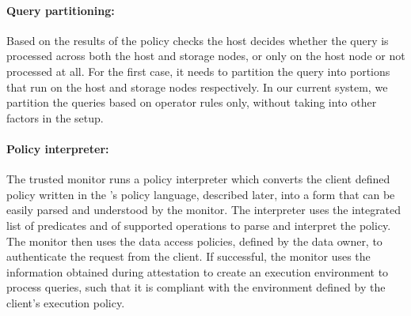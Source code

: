 \paragraph{Query partitioning:} Based on the results of the policy checks the host decides whether the query is processed across both the host and storage nodes, or only on the host node or not processed at all. For the first case, it needs to partition the query into portions that run on the host and storage nodes respectively. In our current system, we partition the queries based on operator rules only, without taking into other factors in the setup.

\paragraph{Policy interpreter:} The trusted monitor runs a policy interpreter which converts the client defined policy written in the \project{}'s policy language, described later, into a form that can be easily parsed and understood by the monitor. The interpreter uses the integrated list of predicates and of supported operations to parse and interpret the policy. The monitor then uses the data access policies, defined by the data owner, to authenticate the request from the client. If successful, the monitor uses the information obtained during attestation to create an execution environment to process queries, such that it is compliant with the environment defined by the client's execution policy.

